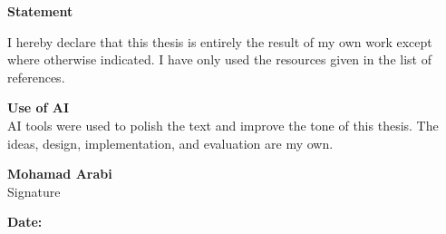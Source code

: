 
\cleardoublepage

\thispagestyle{empty}

\begin{center}\huge\textbf{Statement}\end{center}

\Large
\vfill
I hereby declare that this thesis is entirely the result of my own work except
where otherwise indicated. I have only used the resources given in the list
of references.

\vspace{1.5em}
\textbf{Use of AI} \\
AI tools were used to polish the text and improve the tone of this thesis. The ideas,
design, implementation, and evaluation are my own.

\vfill

\begin{flushright}
\large
\textbf{Mohamad Arabi} \\

\small
Signature \\
\dotfill\hspace{0.1 pt}

\textbf{Date:} \dotfill \\
\end{flushright}
\vfill

\normalsize

